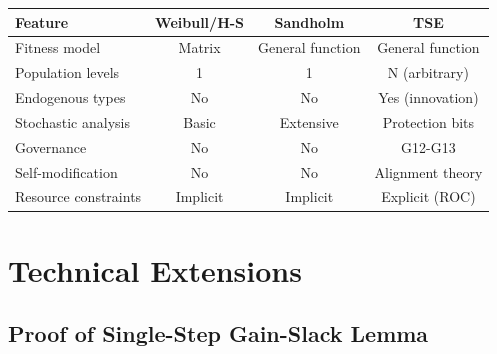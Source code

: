 \documentclass[12pt]{article}
\begin{document}
\begin{center}
\begin{tabular}{lccc}
\toprule
\textbf{Feature} & \textbf{Weibull/H-S} & \textbf{Sandholm} & \textbf{TSE} \\
\midrule
Fitness model & Matrix & General function & General function \\
Population levels & 1 & 1 & N (arbitrary) \\
Endogenous types & No & No & Yes (innovation) \\
Stochastic analysis & Basic & Extensive & Protection bits \\
Governance & No & No & G12-G13 \\
Self-modification & No & No & Alignment theory \\
Resource constraints & Implicit & Implicit & Explicit (ROC) \\
\bottomrule
\end{tabular}
\end{center}


\section{Technical Extensions}
\label{app:extensions}

\subsection{Proof of Single-Step Gain-Slack Lemma}
\end{document}
